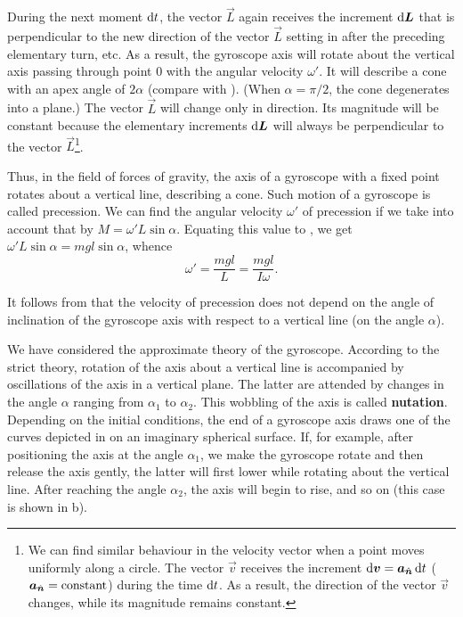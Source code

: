 During the next moment $\mathrm{d} t$, the vector $\vec{L}$ again receives the increment $\mathrm{d}\boldsymbol{L}$ that is perpendicular to the new direction of the vector $\vec{L}$ setting in after the preceding elementary turn, etc. As a result, the gyroscope axis will rotate about the vertical axis passing through point $0$ with the angular velocity $\omega'$. It will describe a cone with an apex angle of $2\alpha$ (compare with ). (When $\alpha=\pi/2$, the cone degenerates into a plane.) The vector $\vec{L}$ will change only in direction. Its magnitude will be constant because the elementary increments $\mathrm{d}\boldsymbol{L}$ will always be perpendicular to the vector $\vec{L}$\footnote{We can find similar behaviour in the velocity vector when a point moves uniformly along a circle. The vector $\vec{v}$ receives the increment $\mathrm{d}\boldsymbol{v}=\boldsymbol{a}_{\hat{\boldsymbol{n}}}\,\mathrm{d} t$ ($\boldsymbol{a}_{\hat{\boldsymbol{n}}}=\text{constant}$) during the time $\mathrm{d} t$. As a result, the direction of the vector $\vec{v}$ changes, while its magnitude remains constant.}.

Thus, in the field of forces of gravity, the axis of a gyroscope with a fixed point rotates about a vertical line, describing a cone. Such motion of a gyroscope is called precession. We can find the angular velocity $\omega'$ of precession if we take into account that by  $M=\omega'L\sin\alpha$. Equating this value to , we get $\omega'L\sin\alpha=mgl\sin\alpha$, whence
\begin{equation}\label{eq:5_72}
	\omega' = \frac{mgl}{L} = \frac{mgl}{I\omega}.
\end{equation}

\noindent
It follows from  that the velocity of precession does not depend on the angle of inclination of the gyroscope axis with respect to a vertical line (on the angle $\alpha$).

We have considered the approximate theory of the gyroscope. According to the strict theory, rotation of the axis about a vertical line is accompanied by oscillations of the axis in a vertical plane. The latter are attended by changes in the angle $\alpha$ ranging from $\alpha_1$ to $\alpha_2$. This wobbling of the axis is called \textbf{nutation}. Depending on the initial conditions, the end of a gyroscope axis draws one of the curves depicted in  on an imaginary spherical surface. If, for example, after positioning the axis at the angle $\alpha_1$, we make the gyroscope rotate and then release the axis gently, the latter will first lower while rotating about the vertical line. After reaching the angle $\alpha_2$, the axis will begin to rise, and so on (this case is shown in b).


